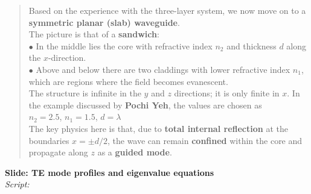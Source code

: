 \documentclass{article}
\begin{document}
\begin{quote}
Based on the experience with the three-layer system, we now move on to a 
\textbf{symmetric planar (slab) waveguide}.\\[2mm]
The picture is that of a \textbf{sandwich}:\\[1mm]
\(\bullet\) In the middle lies the \textcolor{Apple Green}{core} with refractive index \(n_2\) and 
thickness \(d\) along the \(x\)-direction.\\
\(\bullet\) Above and below there are two \textcolor{Tarawera}{claddings} with lower refractive index 
\(n_1\), which are regions where the field becomes evanescent.\\[2mm]
The structure is infinite in the \(y\) and \(z\) directions; it is only finite in \(x\). 
In the example discussed by \textbf{Pochi Yeh}, the values are chosen as\\[1mm]
\(n_2 = 2.5\), \quad \(n_1 = 1.5\), \quad \(d = \lambda\)\\[2mm]
The key physics here is that, due to \textbf{total internal reflection} at the boundaries 
\(x = \pm d/2\), the wave can remain \textbf{confined} within the core and propagate along \(z\) 
as a \textbf{guided mode}.
\end{quote}

\vspace{0.4cm}

\noindent
\textbf{Slide: TE mode profiles and eigenvalue equations}\\[2mm]
\textit{Script:}\\[2mm]
\end{document}
